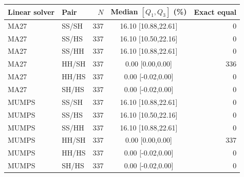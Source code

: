 \begin{tabular}{@{}llrcr@{}}
\toprule
Linear solver & Pair & $N$ & Median $[Q_1,Q_3]$ (\%) & Exact equal\\
\midrule
MA27 & SS/SH & 337 & 16.10 [10.88,22.61] & 0\\
MA27 & SS/HS & 337 & 16.10 [10.50,22.16] & 0\\
MA27 & SS/HH & 337 & 16.10 [10.88,22.61] & 0\\
MA27 & HH/SH & 337 & 0.00 [0.00,0.00] & 336\\
MA27 & HH/HS & 337 & 0.00 [-0.02,0.00] & 0\\
MA27 & SH/HS & 337 & 0.00 [-0.02,0.00] & 0\\
\addlinespace
MUMPS & SS/SH & 337 & 16.10 [10.88,22.61] & 0\\
MUMPS & SS/HS & 337 & 16.10 [10.50,22.16] & 0\\
MUMPS & SS/HH & 337 & 16.10 [10.88,22.61] & 0\\
MUMPS & HH/SH & 337 & 0.00 [0.00,0.00] & 337\\
MUMPS & HH/HS & 337 & 0.00 [-0.02,0.00] & 0\\
MUMPS & SH/HS & 337 & 0.00 [-0.02,0.00] & 0\\
\bottomrule
\end{tabular}
